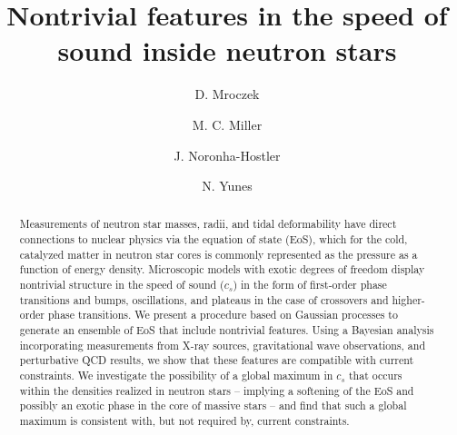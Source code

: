 \documentclass[aps,prd,nofootinbib,tightenlines,notitlepage,floatfix,superscriptaddress,showkeys,twocolumn]{revtex4-1}
\begin{document}


\title{Nontrivial features in the speed of sound inside neutron stars}
\author{D. Mroczek}
\author{M. C. Miller}
\author{J. Noronha-Hostler}
\author{N. Yunes}

\begin{abstract}

Measurements of neutron star masses, radii, and tidal deformability have direct connections to nuclear physics via the equation of state (EoS), which for the cold, catalyzed matter in neutron star cores is commonly represented as the pressure as a function of energy density. Microscopic models with exotic degrees of freedom display nontrivial structure in the speed of sound ($c_s$) in the form of first-order phase transitions and bumps, oscillations, and plateaus in the case of crossovers and higher-order phase transitions. 
We present a procedure based on Gaussian processes to generate an ensemble of EoS that include nontrivial features.
Using a Bayesian analysis incorporating measurements from X-ray sources, gravitational wave observations, and perturbative QCD results, we show that these features are compatible with current constraints. We investigate the possibility of a global maximum in $c_s$ that occurs within the densities realized in neutron stars -- implying a softening of the EoS and possibly an exotic phase in the core of massive stars -- and find that such a global maximum is consistent with, but not required by, current constraints. 

\end{abstract} 
\maketitle
   
\end{document}
